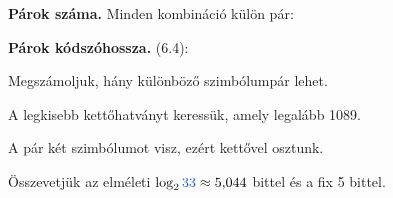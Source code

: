 \begin{elmelet}
\textbf{Párok száma.} Minden kombináció külön pár:
\begin{center}\end{center}


\textbf{Párok kódszóhossza.} (6.4):
\begin{center}\end{center}

\end{elmelet}

Megszámoljuk, hány különböző szimbólumpár lehet.

\begin{center}\end{center}

\begin{center}\end{center}

A legkisebb kettőhatványt keressük, amely legalább 1089.

\begin{center}\end{center}

\begin{center}\end{center}

A pár két szimbólumot visz, ezért kettővel osztunk.

\begin{center}\end{center}

\begin{center}\end{center}

Összevetjük az elméleti $\log_2 {\ca{33}}\approx5{,}044$ bittel és a fix 5 bittel.


